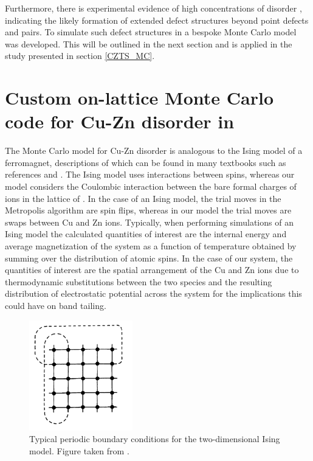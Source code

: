 \documentclass[11pt, twoside]{report}
\begin{document}
Furthermore, there is experimental evidence of high concentrations of disorder \cite{Scragg, pot_fluc_4, neutron, Schorr}, indicating the likely formation of extended defect structures beyond point defects and pairs. To simulate such defect structures in {\CZTS} a bespoke Monte Carlo model was developed. This will be outlined in the next section and is applied in the study presented in section \ref{CZTS_MC}.


\section{Custom on-lattice Monte Carlo code for Cu-Zn disorder in {\CZTS}}\label{Eris}
The Monte Carlo model for Cu-Zn disorder is analogous to the Ising model of a ferromagnet, descriptions of which can be found in many textbooks such as references  and . 
The Ising model uses interactions between spins, whereas our model considers the Coulombic interaction between the bare formal charges of ions in the lattice of {\CZTS}.
In the case of an Ising model, the trial moves in the Metropolis algorithm are spin flips, whereas in our model the trial moves are swaps between Cu and Zn ions. Typically, when performing simulations of an Ising model the calculated quantities of interest are the internal energy and average magnetization of the system as a function of temperature obtained by summing over the distribution of atomic spins. In the case of our system, the quantities of interest are the spatial arrangement of the Cu and Zn ions due to thermodynamic substitutions between the two species and the resulting distribution of electrostatic potential across the system for the implications this could have on band tailing. 

\begin{figure}[h!]
  \centering
    \includegraphics[width=0.4\textwidth]{figures/MC_PBCs.png}
    \caption{Typical periodic boundary conditions for the two-dimensional Ising model. Figure taken from .}
  \label{MC_PBCs}
\end{figure}
\end{document}
